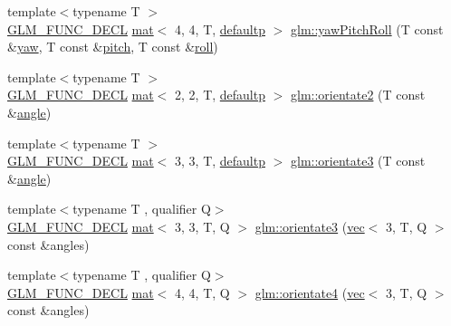 \begin{DoxyCompactItemize}
\item 
{\footnotesize template$<$typename T $>$ }\\\hyperlink{setup_8hpp_ab2d052de21a70539923e9bcbf6e83a51}{G\+L\+M\+\_\+\+F\+U\+N\+C\+\_\+\+D\+E\+CL} \hyperlink{structglm_1_1mat}{mat}$<$ 4, 4, T, \hyperlink{namespaceglm_a36ed105b07c7746804d7fdc7cc90ff25a9d21ccd8b5a009ec7eb7677befc3bf51}{defaultp} $>$ \hyperlink{group__gtx__euler__angles_gae6aa26ccb020d281b449619e419a609e}{glm\+::yaw\+Pitch\+Roll} (T const \&\hyperlink{group__gtc__quaternion_ga53feffeb4001b99e36e216522e465e9e}{yaw}, T const \&\hyperlink{group__gtc__quaternion_ga9bd78e5fe153d07e39fb4c83e73dba73}{pitch}, T const \&\hyperlink{group__gtc__quaternion_ga3ff93afbd9cc29f2ad217f2228e8a95b}{roll})
\item 
{\footnotesize template$<$typename T $>$ }\\\hyperlink{setup_8hpp_ab2d052de21a70539923e9bcbf6e83a51}{G\+L\+M\+\_\+\+F\+U\+N\+C\+\_\+\+D\+E\+CL} \hyperlink{structglm_1_1mat}{mat}$<$ 2, 2, T, \hyperlink{namespaceglm_a36ed105b07c7746804d7fdc7cc90ff25a9d21ccd8b5a009ec7eb7677befc3bf51}{defaultp} $>$ \hyperlink{group__gtx__euler__angles_gae16738a9f1887cf4e4db6a124637608d}{glm\+::orientate2} (T const \&\hyperlink{_s_d_l__opengl__glext_8h_a9e06c1f76a20fed54ca742cd25cb02c4}{angle})
\item 
{\footnotesize template$<$typename T $>$ }\\\hyperlink{setup_8hpp_ab2d052de21a70539923e9bcbf6e83a51}{G\+L\+M\+\_\+\+F\+U\+N\+C\+\_\+\+D\+E\+CL} \hyperlink{structglm_1_1mat}{mat}$<$ 3, 3, T, \hyperlink{namespaceglm_a36ed105b07c7746804d7fdc7cc90ff25a9d21ccd8b5a009ec7eb7677befc3bf51}{defaultp} $>$ \hyperlink{group__gtx__euler__angles_ga7ca98668a5786f19c7b38299ebbc9b4c}{glm\+::orientate3} (T const \&\hyperlink{_s_d_l__opengl__glext_8h_a9e06c1f76a20fed54ca742cd25cb02c4}{angle})
\item 
{\footnotesize template$<$typename T , qualifier Q$>$ }\\\hyperlink{setup_8hpp_ab2d052de21a70539923e9bcbf6e83a51}{G\+L\+M\+\_\+\+F\+U\+N\+C\+\_\+\+D\+E\+CL} \hyperlink{structglm_1_1mat}{mat}$<$ 3, 3, T, Q $>$ \hyperlink{group__gtx__euler__angles_ga7238c8e15c7720e3ca6a45ab151eeabb}{glm\+::orientate3} (\hyperlink{structglm_1_1vec}{vec}$<$ 3, T, Q $>$ const \&angles)
\item 
{\footnotesize template$<$typename T , qualifier Q$>$ }\\\hyperlink{setup_8hpp_ab2d052de21a70539923e9bcbf6e83a51}{G\+L\+M\+\_\+\+F\+U\+N\+C\+\_\+\+D\+E\+CL} \hyperlink{structglm_1_1mat}{mat}$<$ 4, 4, T, Q $>$ \hyperlink{group__gtx__euler__angles_ga4a044653f71a4ecec68e0b623382b48a}{glm\+::orientate4} (\hyperlink{structglm_1_1vec}{vec}$<$ 3, T, Q $>$ const \&angles)

\end{DoxyCompactItemize}

